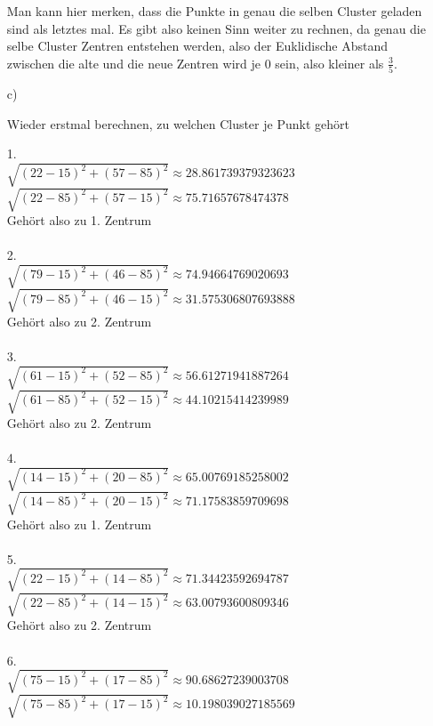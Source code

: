 \begin{enumerate}
Man kann hier merken, dass die Punkte in genau die selben Cluster geladen sind als letztes mal. Es gibt also keinen Sinn weiter zu rechnen, da genau die selbe Cluster Zentren entstehen werden, also der Euklidische Abstand zwischen die alte und die neue Zentren wird je 0 sein, also kleiner als $\frac{3}{5}$. 

\item[c)]

Wieder erstmal berechnen, zu welchen Cluster je Punkt gehört

1. \\ 
$\sqrt{(22-15)^2 + (57-85)^2} \approx 28.861739379323623$ \\ 
$\sqrt{(22-85)^2 + (57-15)^2} \approx 75.71657678474378$ \\ 
Gehört also zu 1. Zentrum \\ \\
2. \\ 
$\sqrt{(79-15)^2 + (46-85)^2} \approx 74.94664769020693$ \\ 
$\sqrt{(79-85)^2 + (46-15)^2} \approx 31.575306807693888$ \\ 
Gehört also zu 2. Zentrum \\ \\
3. \\ 
$\sqrt{(61-15)^2 + (52-85)^2} \approx 56.61271941887264$ \\ 
$\sqrt{(61-85)^2 + (52-15)^2} \approx 44.10215414239989$ \\ 
Gehört also zu 2. Zentrum \\ \\
4. \\ 
$\sqrt{(14-15)^2 + (20-85)^2} \approx 65.00769185258002$ \\ 
$\sqrt{(14-85)^2 + (20-15)^2} \approx 71.17583859709698$ \\ 
Gehört also zu 1. Zentrum \\ \\
5. \\ 
$\sqrt{(22-15)^2 + (14-85)^2} \approx 71.34423592694787$ \\ 
$\sqrt{(22-85)^2 + (14-15)^2} \approx 63.00793600809346$ \\ 
Gehört also zu 2. Zentrum \\ \\
6. \\ 
$\sqrt{(75-15)^2 + (17-85)^2} \approx 90.68627239003708$ \\ 
$\sqrt{(75-85)^2 + (17-15)^2} \approx 10.198039027185569$ \\ 

\end{enumerate}
